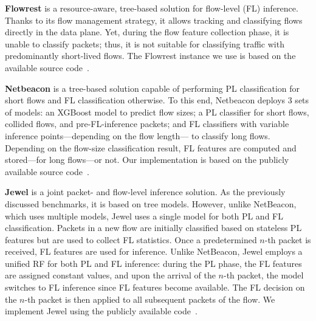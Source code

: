 \documentclass[journal]{IEEEtran}
\theoremstyle{plain} %
\begin{document}
\textbf{Flowrest} is a resource-aware, tree-based solution for flow-level (FL) inference. Thanks to its flow management strategy, it allows tracking and classifying flows directly in the data plane.
Yet, during the flow feature collection phase, it is unable to classify packets; thus, it is not suitable for classifying traffic with predominantly short-lived flows.
The Flowrest instance we use is based on the available source code~\cite{code-flowrest}.

\textbf{Netbeacon} is a tree-based solution capable of performing PL classification for short flows and FL classification otherwise.
To this end, Netbeacon deploys 3 sets of models: an XGBoost model to predict flow sizes; a PL classifier for short flows, collided flows, and pre-FL-inference packets;  and FL classifiers with variable inference points---depending on the flow length--- to classify long flows.
Depending on the flow-size classification result, FL features are computed and stored---for long flows---or not.
Our implementation is based on the publicly available source code~\cite{code-netbeacon}.

\textbf{Jewel} is a joint packet- and flow-level inference solution. As the previously discussed benchmarks, it is based on tree models. However, unlike NetBeacon, which uses multiple models, Jewel uses a single model for both PL and FL classification.
Packets in a new flow are initially classified based on stateless PL features but are used to collect FL statistics.
Once a predetermined $n$-th packet is received, FL features are used for inference.
Unlike NetBeacon, Jewel employs a unified RF for both PL and FL inference: during the PL phase, the FL features are assigned constant values, and upon the arrival of the $n$-th packet, the model switches to FL inference since FL features become available.
The FL decision on the $n$-th packet is then applied to all subsequent packets of the flow.
We implement Jewel using the publicly available code~\cite{code-jewel}.

\end{document}

